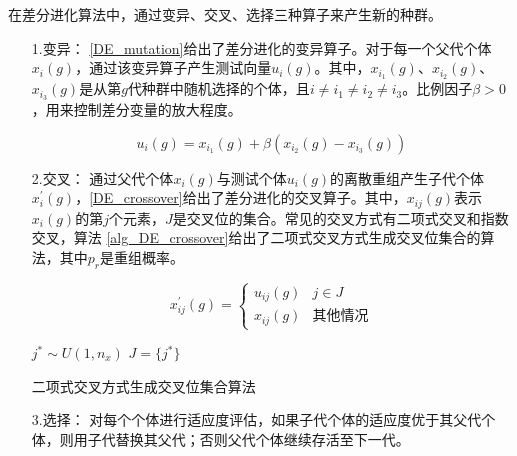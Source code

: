 在差分进化算法中，通过变异、交叉、选择三种算子来产生新的种群。
\begin{enumerate}

\item[1.变异：]\autoref{DE_mutation}给出了差分进化的变异算子。对于每一个父代个体\(x_{i}(g)\)，通过该变异算子产生测试向量\(u_{i}(g)\)。其中，\(x_{i_{1}}(g)\)、\(x_{i_{2}}(g)\)、\(x_{i_{3}}(g)\)是从第\(g\)代种群中随机选择的个体，且\(i \neq i_{1} \neq i_{2} \neq i_{3}\)。比例因子\(\beta > 0\)，用来控制差分变量的放大程度。

\begin{equation}
\label{DE_mutation}
u_{i}(g) = x_{i_{1}}(g)+\beta(x_{i_{2}}(g)-x_{i_{3}}(g))
\end{equation}

\item[2.交叉：]通过父代个体\(x_{i}(g)\)与测试个体\(u_{i}(g)\)的离散重组产生子代个体\(x^{'}_{i}(g)\)，\autoref{DE_crossover}给出了差分进化的交叉算子。其中，\(x_{ij}(g)\)表示\(x_{i}(g)\)的第\(j\)个元素，\(J\)是交叉位的集合。常见的交叉方式有二项式交叉和指数交叉，算法 \ref{alg_DE_crossover}给出了二项式交叉方式生成交叉位集合的算法，其中\(p_{r}\)是重组概率。


\begin{equation}
\label{DE_crossover}
x^{'}_{ij}(g)=
\begin{cases}
u_{ij}(g)& j \in J \\
x_{ij}(g)& \text{其他情况}
\end{cases}
\end{equation}


\IncMargin{1em}
\begin{algorithm}
\emph{$j^{*}\sim U \left( 1,n_{x} \right)$}\;
\emph{$J = \{j^{*}\}$}\;
\caption{二项式交叉方式生成交叉位集合算法}\label{alg_DE_crossover}
\end{algorithm}\DecMargin{1em}

\item[3.选择：]对每个个体进行适应度评估，如果子代个体的适应度优于其父代个体，则用子代替换其父代；否则父代个体继续存活至下一代。

\end{enumerate}


